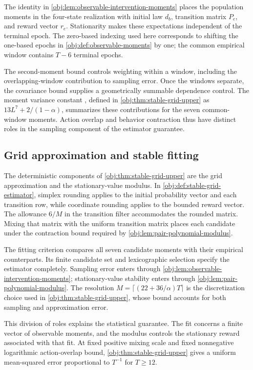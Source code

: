 The identity in \cref{obj:lem:observable-intervention-moments} places the population moments in the four-state realization with initial law \(d_b\), transition matrix \(P_e\), and reward vector \(r_e\). Stationarity makes these expectations independent of the terminal epoch. The zero-based indexing used here corresponds to shifting the one-based epochs in \cref{obj:def:observable-moments} by one; the common empirical window contains \(T-6\) terminal epochs.

The second-moment bound controls weighting within a window, including the overlapping-window contribution to sampling error. Once the windows separate, the covariance bound supplies a geometrically summable dependence control. The moment variance constant , defined in \cref{obj:thm:stable-grid-upper} as \(13L^7+2/(1-\alpha)\), summarizes these contributions for the seven common-window moments. Action overlap and behavior contraction thus have distinct roles in the sampling component of the estimator guarantee.

\subsection{Grid approximation and stable fitting}

The deterministic components of \cref{obj:thm:stable-grid-upper} are the grid approximation and the stationary-value modulus. In \cref{obj:def:stable-grid-estimator}, simplex rounding applies to the initial probability vector and each transition row, while coordinate rounding applies to the bounded reward vector. The allowance \(6/M\) in the transition filter accommodates the rounded matrix. Mixing that matrix with the uniform transition matrix places each candidate under the contraction bound required by \cref{obj:lem:pair-polynomial-modulus}.

The fitting criterion compares all seven candidate moments with their empirical counterparts. Its finite candidate set and lexicographic selection specify the estimator completely. Sampling error enters through \cref{obj:lem:observable-intervention-moments}; stationary-value stability enters through \cref{obj:lem:pair-polynomial-modulus}. The resolution \(M=\lceil(22+36/\alpha)T\rceil\) is the discretization choice used in \cref{obj:thm:stable-grid-upper}, whose bound accounts for both sampling and approximation error.

This division of roles explains the statistical guarantee. The fit concerns a finite vector of observable moments, and the modulus controls the stationary reward associated with that fit. At fixed positive mixing scale and fixed nonnegative logarithmic action-overlap bound, \cref{obj:thm:stable-grid-upper} gives a uniform mean-squared error proportional to \(T^{-1}\) for \(T\geq12\).

